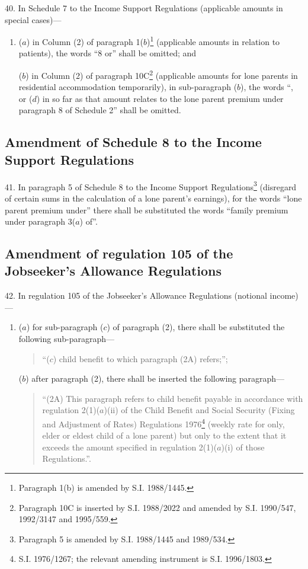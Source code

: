 \documentclass[12pt,a4paper]{article}
\begin{document}
40.  In Schedule 7 to the Income Support Regulations (applicable amounts in special cases)—
\begin{enumerate}\item[]
($a$) in Column (2) of paragraph 1($b$)\footnote{\frenchspacing Paragraph 1(b) is amended by S.I. 1988/1445.} (applicable amounts in relation to patients), the words “8 or” shall be omitted; and

($b$) in Column (2) of paragraph 10C\footnote{\frenchspacing Paragraph 10C is inserted by S.I. 1988/2022 and amended by S.I. 1990/547, 1992/3147 and 1995/559.} (applicable amounts for lone parents in residential accommodation temporarily), in sub-paragraph ($b$), the words “, or ($d$) in so far as that amount relates to the lone parent premium under paragraph 8 of Schedule 2” shall be omitted.
\end{enumerate}

\subsection[41. Amendment of Schedule 8 to the Income Support Regulations]{Amendment of Schedule 8 to the Income Support Regulations}

41.  In paragraph 5 of Schedule 8 to the Income Support Regulations\footnote{\frenchspacing Paragraph 5 is amended by S.I. 1988/1445 and 1989/534.} (disregard of certain sums in the calculation of a lone parent’s earnings), for the words “lone parent premium under” there shall be substituted the words “family premium under paragraph 3($a$) of”.

\subsection[42. Amendment of regulation 105 of the Jobseeker’s Allowance Regulations]{Amendment of regulation 105 of the Jobseeker’s Allowance Regulations}

42.  In regulation 105 of the Jobseeker’s Allowance Regulations (notional income)—
\begin{enumerate}\item[]
($a$) for sub-paragraph ($c$) of paragraph (2), there shall be substituted the following sub-paragraph—
\begin{quotation}
“($c$) child benefit to which paragraph (2A) refers;”;
\end{quotation}

($b$) after paragraph (2), there shall be inserted the following paragraph—
\begin{quotation}
“(2A) This paragraph refers to child benefit payable in accordance with regulation 2(1)($a$)(ii) of the Child Benefit and Social Security (Fixing and Adjustment of Rates) Regulations 1976\footnote{\frenchspacing S.I. 1976/1267; the relevant amending instrument is S.I. 1996/1803.} (weekly rate for only, elder or eldest child of a lone parent) but only to the extent that it exceeds the amount specified in regulation 2(1)($a$)(i) of those Regulations.”.
\end{quotation}
\end{enumerate}
\end{document}
